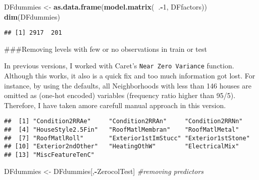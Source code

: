 \documentclass[]{article}
\newenvironment{Shaded}{\begin{snugshade}}{\end{snugshade}}
\newcommand{\CommentTok}[1]{\textcolor[rgb]{0.56,0.35,0.01}{\textit{#1}}}
\newcommand{\DecValTok}[1]{\textcolor[rgb]{0.00,0.00,0.81}{#1}}
\newcommand{\KeywordTok}[1]{\textcolor[rgb]{0.13,0.29,0.53}{\textbf{#1}}}
\newcommand{\NormalTok}[1]{#1}
\newcommand{\OperatorTok}[1]{\textcolor[rgb]{0.81,0.36,0.00}{\textbf{#1}}}
\newcommand{\StringTok}[1]{\textcolor[rgb]{0.31,0.60,0.02}{#1}}
\begin{document}
\begin{Shaded}
\begin{Highlighting}[]
\NormalTok{DFdummies <-}\StringTok{ }\KeywordTok{as.data.frame}\NormalTok{(}\KeywordTok{model.matrix}\NormalTok{(}\OperatorTok{~}\NormalTok{.}\OperatorTok{-}\DecValTok{1}\NormalTok{, DFfactors))}
\KeywordTok{dim}\NormalTok{(DFdummies)}
\end{Highlighting}
\end{Shaded}

\begin{verbatim}
## [1] 2917  201
\end{verbatim}

\#\#\#Removing levels with few or no observations in train or test

In previous versions, I worked with Caret's
\texttt{Near\ Zero\ Variance} function. Although this works, it also is
a quick fix and too much information got lost. For instance, by using
the defaults, all Neighborhoods with less than 146 houses are omitted as
(one-hot encoded) variables (frequency ratio higher than 95/5).
Therefore, I have taken amore carefull manual approach in this version.

\begin{Shaded}
\end{Shaded}

\begin{verbatim}
##  [1] "Condition2RRAe"     "Condition2RRAn"     "Condition2RRNn"    
##  [4] "HouseStyle2.5Fin"   "RoofMatlMembran"    "RoofMatlMetal"     
##  [7] "RoofMatlRoll"       "Exterior1stImStucc" "Exterior1stStone"  
## [10] "Exterior2ndOther"   "HeatingOthW"        "ElectricalMix"     
## [13] "MiscFeatureTenC"
\end{verbatim}

\begin{Shaded}
\begin{Highlighting}[]
\NormalTok{DFdummies <-}\StringTok{ }\NormalTok{DFdummies[,}\OperatorTok{-}\NormalTok{ZerocolTest] }\CommentTok{#removing predictors}
\end{Highlighting}
\end{Shaded}
\end{document}
